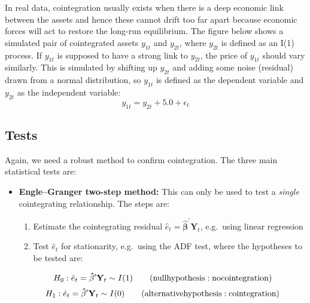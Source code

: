\documentclass[11pt]{article}
\begin{document}
In real data, cointegration usually exists when there is a deep
economic link between the assets and hence these cannot drift too far
apart because economic forces will act to restore the long-run
equilibrium. The figure below shows a simulated pair of cointegrated
assets \(y_{1t}\) and \(y_{2t}\), where \(y_{2t}\) is defined as an I(1)
process. If \(y_{1t}\) is supposed to have a strong link to \(y_{2t}\),
the price of \(y_{1t}\) should vary similarly. This is simulated by
shifting up \(y_{2t}\) and adding some noise (residual) drawn from a
normal distribution, so \(y_{1t}\) is defined as the dependent variable
and \(y_{2t}\) as the independent variable:
\begin{equation}
y_{1t} = y_{2t} + 5.0 + \epsilon_t
\end{equation}

    \begin{center}
    \end{center}

    \subsection{Tests}\label{tests}
Again, we need a robust method to confirm cointegration. The
three main statistical tests are:
\begin{itemize}
\item
  \textbf{Engle--Granger two-step method:} This can only be used to test
  a \emph{single} cointegrating relationship. 
  The steps are:
  \begin{enumerate}
  \def\labelenumi{(\roman{enumi})}
  \item
    Estimate the cointegrating residual $\hat{e}_t =
    \mathbf{\hat{\beta}^\prime} \mathbf{Y}_t$, e.g.~using linear
    regression
  \item
    Test \(\hat{e}_t\) for stationarity, e.g.~using the ADF test, where
    the hypotheses to be tested are:
  \end{enumerate}
  \begin{equation}
  H_0 \space :  \space \hat{e}_t = \mathbf{\hat{\beta}^\prime} \mathbf{Y}_t \sim I(1) \qquad \mathrm{(null hypothesis: no cointegration)}
  \end{equation}
  \begin{equation}
  H_1 \space :  \space \hat{e}_t = \mathbf{\hat{\beta}^\prime} \mathbf{Y}_t \sim I(0) \qquad \mathrm{(alternative hypothesis: cointegration)}
  \end{equation}
\end{itemize}
\end{document}
